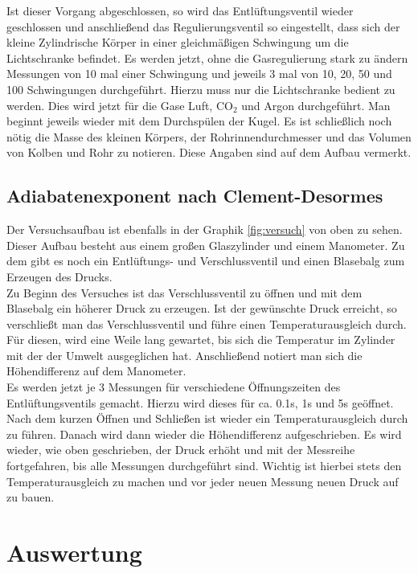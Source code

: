 \documentclass[12pt,a4paper,titlepage,headinclude,bibtotoc]{scrartcl}
\begin{document}
Ist dieser Vorgang abgeschlossen, so wird das Entlüftungsventil wieder geschlossen und anschließend das Regulierungsventil so eingestellt, dass sich der kleine Zylindrische Körper in einer gleichmäßigen Schwingung um die Lichtschranke befindet.
Es werden jetzt, ohne die Gasregulierung stark zu ändern Messungen von 10 mal einer Schwingung und jeweils 3 mal von 10, 20, 50 und 100 Schwingungen durchgeführt.
Hierzu muss nur die Lichtschranke bedient zu werden.
Dies wird jetzt für die Gase Luft, CO$_2$ und Argon durchgeführt.
Man beginnt jeweils wieder mit dem Durchspülen der Kugel.
Es ist schließlich noch nötig die Masse des kleinen Körpers, der Rohrinnendurchmesser und das Volumen von Kolben und Rohr zu notieren.
Diese Angaben sind auf dem Aufbau vermerkt.

\subsection{Adiabatenexponent nach Clement-Desormes}
\label{sec:clem}
Der Versuchsaufbau ist ebenfalls in der Graphik \ref{fig:versuch} von oben zu sehen.
Dieser Aufbau besteht aus einem großen Glaszylinder und einem Manometer.
Zu dem gibt es noch ein Entlüftungs- und Verschlussventil und einen Blasebalg zum Erzeugen des Drucks.\\
Zu Beginn des Versuches ist das Verschlussventil zu öffnen und mit dem Blasebalg ein höherer Druck zu erzeugen.
Ist der gewünschte Druck erreicht, so verschließt man das Verschlussventil und führe einen Temperaturausgleich durch.
Für diesen, wird eine Weile lang gewartet, bis sich die Temperatur im Zylinder mit der der Umwelt ausgeglichen hat.
Anschließend notiert man sich die Höhendifferenz auf dem Manometer.\\
Es werden jetzt je 3 Messungen für verschiedene Öffnungszeiten des Entlüftungsventils gemacht.
Hierzu wird dieses für ca. 0.1s, 1s und 5s geöffnet.
Nach dem kurzen Öffnen und Schließen ist wieder ein Temperaturausgleich durch zu führen.
Danach wird dann wieder die Höhendifferenz aufgeschrieben.
Es wird wieder, wie oben geschrieben, der Druck erhöht und mit der Messreihe fortgefahren, bis alle Messungen durchgeführt sind.
Wichtig ist hierbei stets den Temperaturausgleich zu machen und vor jeder neuen Messung neuen Druck auf zu bauen.

\section{Auswertung}
\label{sec:auswertung}
\end{document}
